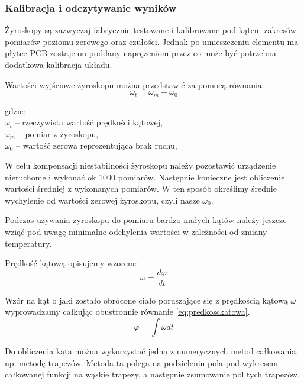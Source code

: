 \subsubsection{Kalibracja i odczytywanie wyników}
Żyroskopy są zazwyczaj fabrycznie testowane i kalibrowane pod kątem zakresów pomiarów poziomu zerowego oraz czułości. 
Jednak po umieszczeniu elementu ma płytce PCB zostaje on poddany naprężeniom przez co może być potrzebna dodatkowa kalibracja układu.

Wartości wyjściowe żyroskopu można przedstawić za pomocą równania:
\begin{equation}
  \omega_{t} = \omega_{m} - \omega_{0}
\end{equation}
\begin{tabbing}
  gdzie: \= \\
    \> $\omega_{t}$ -- rzeczywista wartość prędkości kątowej, \\
    \> $\omega_{m}$ -- pomiar z żyroskopu,\\
    \> $\omega_{0}$ -- wartość zerowa reprezentująca brak ruchu,\\
\end{tabbing}

W celu kompensacji niestabilności żyroskopu należy pozostawić urządzenie nieruchome i wykonać ok 1000 pomiarów. Następnie
konieczne jest obliczenie wartości średniej z wykonanych pomiarów. W ten sposób określimy średnie wychylenie od wartości
zerowej żyroskopu, czyli nasze $\omega_{0}$.

Podczas używania żyroskopu do pomiaru bardzo małych kątów należy jeszcze wziąć pod uwagę minimalne odchylenia wartości w
zależności od zmiany temperatury.

Prędkość kątową opisujemy wzorem: 
\begin{equation}
  \label{eq:predkosckatowa}
  \omega = \frac{d\varphi}{dt}
\end{equation}

Wzór na kąt o jaki zostało obrócone ciało poruszające się z prędkością kątową $\omega$ wyprowadzamy całkując obustronnie równanie \ref{eq:predkosckatowa}.
\begin{equation}
  \varphi = \int \omega dt
\end{equation}

Do obliczenia kąta można wykorzystać jedną z numerycznych metod całkowania, np. metodę trapezów. Metoda ta polega na podzieleniu pola pod wykresem całkowanej funkcji na wąskie trapezy, a następnie zsumowanie pól tych trapezów.

